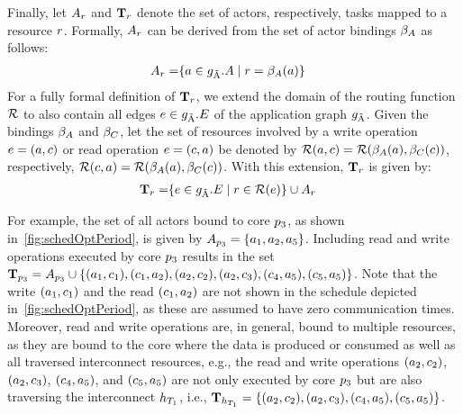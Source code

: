 Finally, let $A_r$ and $\mathbf{T}_r$ denote the set of actors, respectively, tasks mapped to a resource $r$.
Formally, $A_r$ can be derived from the set of actor bindings $\beta_A$ as follows:
\begin{align}
  A_r = &\{ a \in g_{\tilde{\textrm{A}}}.A \mid r = \beta_A(a) \}
\end{align}
For a fully formal definition of $\mathbf{T}_r$, we extend the domain of the routing function $\mathcal{R}$ to also contain all edges $e \in g_{\tilde{\textrm{A}}}.E$ of the application graph $g_{\tilde{\textrm{A}}}$.
Given the bindings $\beta_A$ and $\beta_C$, let the set of resources involved by a write operation $e = (a, c)$ or read operation $e = (c, a)$  be denoted by $\mathcal{R}(a, c) = \mathcal{R}(\beta_A(a), \beta_C(c))$, respectively, $\mathcal{R}(c, a) = \mathcal{R}(\beta_A(a), \beta_C(c))$.
With this extension, $\mathbf{T}_r$ is given by:
\begin{align}
  \mathbf{T}_r  = &\{ e \in g_{\tilde{\textrm{A}}}.E \mid r \in \mathcal{R}(e) \} \cup A_r
\end{align}
\par
For example, the set of all actors bound to core $p_3$, as shown in~\cref{fig:schedOptPeriod}, is given by $A_{p_3} = \{ a_1, a_2, a_5 \}$.
Including read and write operations executed by core $p_3$ results in the set $\mathbf{T}_{p_3} = A_{p_3} \cup \{ (a_1,c_1), (c_1,a_2), (a_2,c_2), (a_2,c_3), (c_4,a_5), (c_5,a_5) \}$.
Note that the write $(a_1,c_1)$ and the read $(c_1,a_2)$ are not shown in the schedule depicted in~\cref{fig:schedOptPeriod}, as these are assumed to have zero communication times.
Moreover, read and write operations are, in general, bound to multiple resources, as they are bound to the core where the data is produced or consumed as well as all traversed interconnect resources, e.g., the read and write operations $(a_2,c_2)$, $(a_2,c_3)$, $(c_4,a_5)$, and $(c_5,a_5)$ are not only executed by core $p_3$ but are also traversing the interconnect ${h_{T_{1}}}$, i.e., $\mathbf{T}_{h_{T_{1}}} = \{ (a_2,c_2), (a_2,c_3), (c_4,a_5), (c_5,a_5) \}$.

